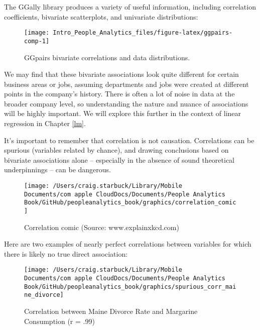 \documentclass[
]{book}
\begin{document}
The GGally library produces a variety of useful information, including correlation coefficients, bivariate scatterplots, and univariate distributions:

\begin{figure}

{\centering \texttt{[image: Intro\_People\_Analytics\_files/figure-latex/ggpairs-comp-1]} 

}

\caption{GGpairs bivariate correlations and data distributions.}\label{fig:ggpairs-comp}
\end{figure}

We may find that these bivariate associations look quite different for certain business areas or jobs, assuming departments and jobs were created at different points in the company's history. There is often a lot of noise in data at the broader company level, so understanding the nature and nuance of associations will be highly important. We will explore this further in the context of linear regression in Chapter \ref{lm}.

It's important to remember that correlation is not causation. Correlations can be spurious (variables related by chance), and drawing conclusions based on bivariate associations alone -- especially in the absence of sound theoretical underpinnings -- can be dangerous.

\begin{figure}

{\centering \texttt{[image: /Users/craig.starbuck/Library/Mobile Documents/com~apple~CloudDocs/Documents/People Analytics Book/GitHub/peopleanalytics\_book/graphics/correlation\_comic]} 

}

\caption{Correlation comic (Source: www.explainxkcd.com)}\label{fig:corr-comic}
\end{figure}

Here are two examples of nearly perfect correlations between variables for which there is likely no true direct association:

\begin{figure}

{\centering \texttt{[image: /Users/craig.starbuck/Library/Mobile Documents/com~apple~CloudDocs/Documents/People Analytics Book/GitHub/peopleanalytics\_book/graphics/spurious\_corr\_maine\_divorce]} 

}

\caption{Correlation between Maine Divorce Rate and Margarine Consumption (r = .99)}\label{fig:spur-corr-1}
\end{figure}
\end{document}
